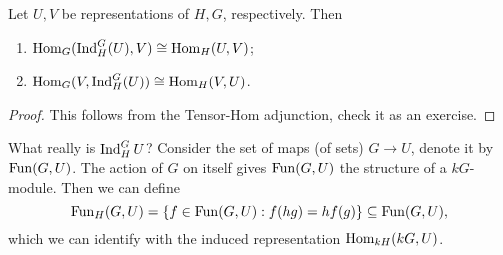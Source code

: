 \begin{corollary}
  Let $U, V$ be representations of
  $H, G$, respectively. Then
  \begin{enumerate}
    \item $\operatorname{Hom}_G(\operatorname{Ind}_H^G(U), V) \cong \operatorname{Hom}_H(U, V)$;
    \item $\operatorname{Hom}_G(V, \operatorname{Ind}_H^G(U)) \cong \operatorname{Hom}_H(V, U)$.
  \end{enumerate}
\end{corollary}

\begin{proof}
  This follows from the Tensor-Hom
  adjunction, check it as an exercise.
\end{proof}

\begin{remark}
  What really is $\operatorname{Ind}_H^G U$?
  Consider the set of maps (of sets)
  $G \to U$, denote it by $\operatorname{Fun}(G, U)$.
  The action of $G$ on itself gives
  $\operatorname{Fun}(G, U)$ the structure of a
  $kG$-module. Then we can define
  \[
    \operatorname{Fun}_H(G, U)
    = \{f \in \operatorname{Fun}(G, U) : f(hg) = h f(g)\}
    \subseteq \operatorname{Fun}(G, U),
  \]
  which we can identify with
  the induced representation
  $\operatorname{Hom}_{kH}(kG, U)$.
\end{remark}
